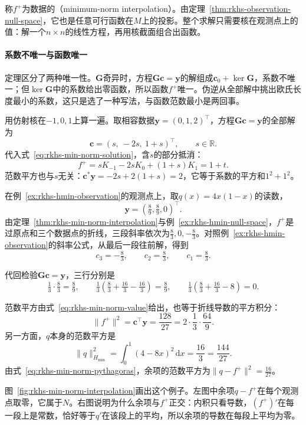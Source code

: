称$f^+$为数据的（minimum-norm interpolation）。由定理~\ref{thm:rkhs-observation-null-space}，它也是任意可行函数在$M$上的投影。整个求解只需要核在观测点上的值：解一个$n\times n$的线性方程，再用核截面组合出函数。

\paragraph{系数不唯一与函数唯一}

定理区分了两种唯一性。$\bm G$奇异时，方程$\bm G\bm c=\bm y$的解组成$\bm c_0+\ker\bm G$，系数不唯一；但$\ker\bm G$中的系数给出零函数，所以函数$f^+$唯一。伪逆从全部解中挑出欧氏长度最小的系数，这只是选了一种写法，与函数范数最小是两回事。

用仿射核在$-1,0,1$上算一遍。取相容数据$\bm y=(0,1,2)^{\top}$，方程$\bm G\bm c=\bm y$的全部解为
\[
\bm c=(s,\ -2s,\ 1+s)^{\top},\qquad s\in\mathbb R .
\]
代入式~\eqref{eq:rkhs-min-norm-solution}，含$s$的部分抵消：
\[
f^+=sK_{-1}-2sK_0+(1+s)K_1=1+t .
\]
范数平方也与$s$无关：$\bm c^*\bm y=-2s+2(1+s)=2$，它等于系数的平方和$1^2+1^2$。

\begin{example}[最小值核的折线插值]
\label{ex:rkhs-hmin-interpolation}
在例~\ref{ex:rkhs-hmin-observation}的观测点上，取$q(x)=4x(1-x)$的读数，
\[
\bm y=(\tfrac89,\tfrac89,0)^{\top}.
\]
由定理~\ref{thm:rkhs-min-norm-interpolation}与例~\ref{ex:rkhs-hmin-null-space}，$f^+$是过原点和三个数据点的折线，三段斜率依次为$\tfrac83,0,-\tfrac83$。对照例~\ref{ex:rkhs-hmin-observation}的斜率公式，从最后一段往前解，得到
\[
c_3=-\tfrac83,\qquad c_2=\tfrac83,\qquad c_1=\tfrac83 .
\]

代回检验$\bm G\bm c=\bm y$，三行分别是
\[
\tfrac13\cdot\tfrac83=\tfrac89,\qquad
\tfrac13(\tfrac83+\tfrac{16}3-\tfrac{16}3)=\tfrac89,\qquad
\tfrac13(\tfrac83+\tfrac{16}3-8)=0 .
\]

范数平方由式~\eqref{eq:rkhs-min-norm-value}给出，也等于折线导数的平方积分：
\[
\lVert f^+\rVert^2=\bm c^{\top}\bm y=\frac{128}{27}=2\cdot\frac13\cdot\frac{64}9 .
\]
另一方面，$q$本身的范数平方是
\[
\lVert q\rVert_{H_{\min}}^2=\int_0^1(4-8x)^2\,\mathrm dx=\frac{16}3=\frac{144}{27}.
\]
由式~\eqref{eq:rkhs-min-norm-pythagoras}，余项的范数平方为$\lVert q-f^+\rVert^2=\tfrac{16}{27}$。
\end{example}

图~\ref{fig:rkhs-min-norm-interpolation}画出这个例子。左图中余项$q-f^+$在每个观测点取零，它属于$N$。右图说明为什么余项与$f^+$正交：内积只看导数，$(f^+)'$在每一段上是常数，恰好等于$q'$在该段上的平均，所以余项的导数在每段上平均为零。

